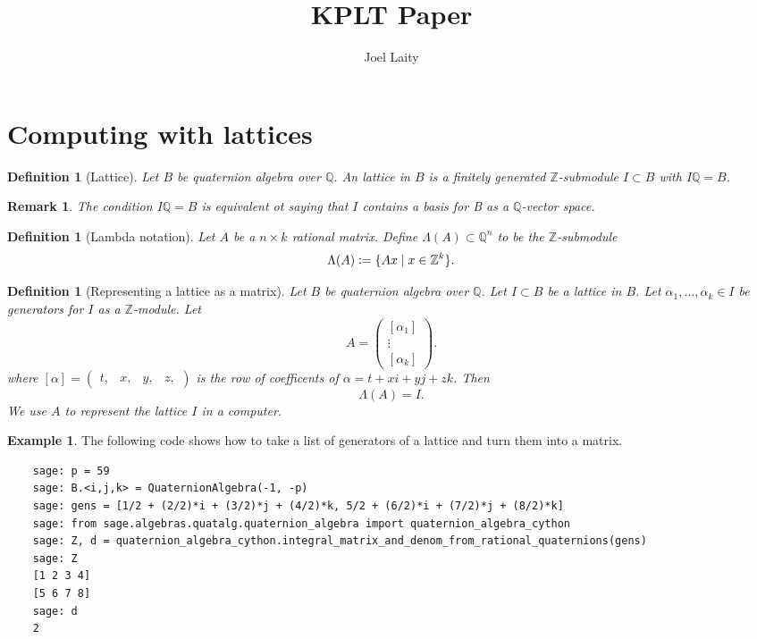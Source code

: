 \documentclass[10pt]{article}
\title{KPLT Paper}
\author{Joel Laity}
\theoremstyle{plain}
\newtheorem{remark}[theorem]{Remark}
\newtheorem{definition}[theorem]{Definition}
\theoremstyle{definition}
\newtheorem{example}[theorem]{Example}
\newcommand{\Z}{\mathbb{Z}}
\newcommand{\Q}{\mathbb{Q}}
\begin{document}
\maketitle

\section{Computing with lattices}

\begin{definition}[Lattice]
    Let \( B \) be quaternion algebra over \( \Q \).
    An \emph{lattice} in \( B \) is a finitely generated \( \Z \)-submodule \( I \subset B \) with \( I\Q = B \).
\end{definition}

\begin{remark}
    The condition \( I\Q = B \) is equivalent ot saying that \( I \) contains a basis for B as a \( \Q \)-vector space.
\end{remark}

\begin{definition}[Lambda notation]
    Let \( A \) be a \( n \times k \) rational matrix.
    Define \( \Lambda(A) \subset \Q^n \) to be the \( \Z \)-submodule
    \[
        \Lambda(A) \vcentcolon = \{ Ax \mid x \in \Z^k \}.
    \]
\end{definition}

\begin{definition}[Representing a lattice as a matrix]
    Let \( B \) be quaternion algebra over \( \Q \).
    Let \( I \subset B \) be a lattice in \( B \).
    Let \( \alpha_1, \dots , \alpha_k \in I\) be generators for \( I \) as a \( \Z \)-module.
    Let
    \[
        A =
        \begin{pmatrix}
            [\alpha_1] \\  \vdots \\ [\alpha_k]
        \end{pmatrix}.
    \]
    where \( [\alpha] =  \begin{pmatrix} t, & x, & y, & z, \end{pmatrix} \) is the row of coefficents of \( \alpha = t + xi + yj + zk \).
    Then
    \[
        \Lambda(A) = I.
    \]
    We use \( A \) to represent the lattice \( I \) in a computer.
\end{definition}


\begin{example}
    The following code shows how to take a list of generators of a lattice and turn them into a matrix.
    \begin{lstlisting}
    sage: p = 59
    sage: B.<i,j,k> = QuaternionAlgebra(-1, -p)
    sage: gens = [1/2 + (2/2)*i + (3/2)*j + (4/2)*k, 5/2 + (6/2)*i + (7/2)*j + (8/2)*k]
    sage: from sage.algebras.quatalg.quaternion_algebra import quaternion_algebra_cython
    sage: Z, d = quaternion_algebra_cython.integral_matrix_and_denom_from_rational_quaternions(gens)
    sage: Z
    [1 2 3 4]
    [5 6 7 8]
    sage: d
    2
  \end{lstlisting}
\end{example}
\end{document}
